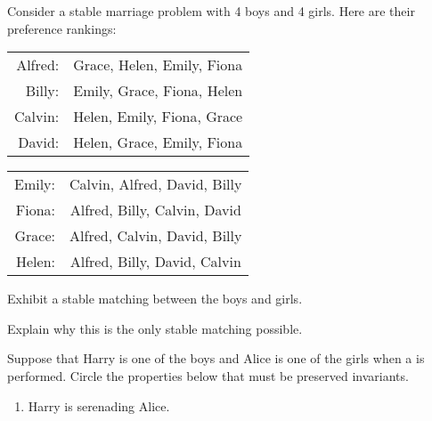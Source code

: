 \documentclass[12pt,oneside]{article}
\begin{document}
\begin{problem}{0}
Consider a stable marriage problem with 4 boys and 4 girls. Here
are their preference rankings:

\begin{center}
\begin{tabular}{r|c} 
Alfred:    & Grace, Helen, Emily, Fiona    \\
Billy:     & Emily, Grace, Fiona, Helen    \\
Calvin:    & Helen, Emily, Fiona, Grace    \\
David:     & Helen, Grace, Emily, Fiona
\end{tabular}
\end{center}

\begin{center}
\begin{tabular}{r|c} 
Emily:     & Calvin, Alfred, David,  Billy    \\
Fiona:     & Alfred, Billy,  Calvin, David    \\
Grace:     & Alfred, Calvin, David,  Billy    \\
Helen:     & Alfred, Billy,  David,  Calvin
\end{tabular}
\end{center}

\bparts

Exhibit a stable matching between the boys and girls.

\examspace[2in]


 Explain why this is the only stable matching possible.

\examspace[2in]

 Suppose that Harry is one of the boys and Alice is one of the girls
when a  is performed.  Circle the properties
below that must be preserved invariants.
\renewcommand{\theenumi}{\roman{enumi}}
\renewcommand{\labelenumi}{(\theenumi)}

\begin{enumerate}

\item Harry is serenading Alice.



\end{enumerate}
\end{problem}
\end{document}

